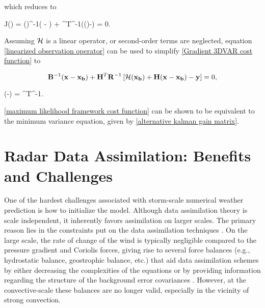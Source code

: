 \noindent which reduces to


\be
    \label{Gradient 3DVAR cost function}
    \nabla J() = ()^{-1}( - ) + ^T^{-1}(()-) = 0.
\ee


\noindent Assuming $\mathcal{H}$ is a linear operator, or second-order terms are neglected, equation \ref{linearized observation operator} can be used to simplify \ref{Gradient 3DVAR cost function} to


$$
    \mathbf{B}^{-1}(\mathbf{x}-\mathbf{x_b}) + \mathbf{H}^T\mathbf{R}^{-1}\left[\mathcal{H}(\mathbf{x_b}) + \mathbf{H}(\mathbf{x}-\mathbf{x_b}) - \mathbf{y}\right] = 0,
$$


\be
    \label{maximum likelihood framework cost function}
    (-) = ^T^{-1}.
\ee


\noindent  \ref{maximum likelihood framework cost function} can be shown to be equivalent to the minimum variance equation, given by \ref{alternative kalman gain matrix}.




\section{Radar Data Assimilation: Benefits and Challenges}
\label{Radar Data Assimilation: Benefits and Challenges}

One of the hardest challenges associated with storm-scale numerical weather prediction is how to initialize the model. Although data assimilation theory is scale independent, it inherently favors assimilation on larger scales. The primary reason lies in the constraints put on the data assimilation techniques \citep{sun2005challenges}. On the large scale, the rate of change of the wind is typically negligible compared to the pressure gradient and Coriolis forces, giving rise to several force balances (e.g., hydrostatic balance, geostrophic balance, etc.) that aid data assimilation schemes by either decreasing the complexities of the equations or by providing information regarding the structure of the background error covariances \citep{lorenc1995assimilation}. However, at the convective-scale these balances are no longer valid, especially in the vicinity of strong convection.


